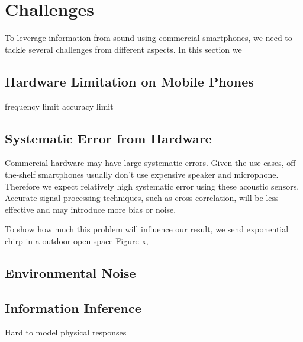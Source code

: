 \section{Challenges}
\label{sec:chall}

To leverage information from sound using commercial smartphones, we need to
tackle several challenges from different aspects. In this section we 


\subsection{Hardware Limitation on Mobile Phones}

frequency limit
accuracy limit


\subsection{Systematic Error from Hardware}
Commercial hardware may have large systematic errors. 
Given the use cases, off-the-shelf smartphones usually don't use expensive
speaker and microphone. Therefore we expect relatively high systematic error 
using these acoustic sensors. Accurate signal processing techniques, such as 
cross-correlation, will be less effective and may introduce more bias or noise.



To show how much this problem will influence our result, we send exponential chirp 
in a outdoor open space Figure x, 


\subsection{Environmental Noise}


\subsection{Information Inference}
Hard to model physical responses


% 
% 
% 
% 
% 
% 
